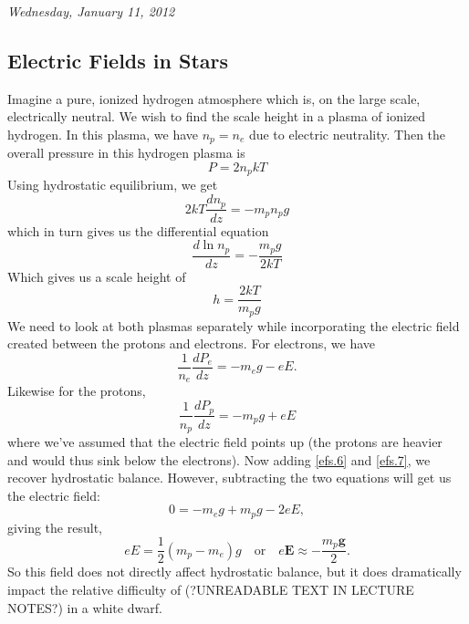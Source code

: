 \documentclass[10pt]{article}
\numberwithin{equation}{section}
\newcommand{\n}{\noindent}
\begin{document}
	\n \textit{Wednesday, January 11, 2012}
	\subsection{Electric Fields in Stars}
	Imagine a pure, ionized hydrogen atmosphere which is, on the large 
scale, electrically neutral. We wish to find the scale height in a plasma 
of ionized hydrogen. In this plasma, we have $n_p=n_e$ due to electric 
neutrality. Then the overall pressure in this hydrogen plasma is
	\begin{equation}
		\label{efs.2} P=2n_pkT
	\end{equation}
	Using hydrostatic equilibrium, we get
	\begin{equation}
		\label{efs.3} 2kT\frac{dn_p}{dz}=-m_pn_pg
	\end{equation}
	which in turn gives us the differential equation
	\begin{equation}
		\label{efs.4} \frac{d\ln n_p}{dz}=-\frac{m_pg}{2kT}
	\end{equation}
	Which gives us a scale height of
	\begin{equation}
		\label{efs.5} h=\frac{2kT}{m_pg}
	\end{equation}
	We need to look at both plasmas separately while incorporating the 
electric field created between the protons and electrons. For electrons, we 
have
	\begin{equation}
		\label{efs.6} \frac{1}{n_e}\frac{dP_e}{dz}=-m_eg-eE.
	\end{equation}
	Likewise for the protons,
	\begin{equation}
		\label{efs.7} \frac{1}{n_p}\frac{dP_p}{dz}=-m_pg+eE
	\end{equation}
	where we've assumed that the electric field points up (the protons are 
heavier and would thus sink below the electrons). Now adding \eqref{efs.6} 
and \eqref{efs.7}, we recover hydrostatic balance. However, subtracting the 
two equations will get us the electric field:
	\begin{equation}
		\label{efs.8} 0=-m_eg+m_pg-2eE,
	\end{equation}
	giving the result,
	\begin{equation}
		\label{efs.9} eE=\frac{1}{2}\left(m_p-m_e\right)g \quad \textrm{or}
\quad e\mathbf{E}\approx -\frac{m_p\mathbf{g}}{2}.
	\end{equation}
	So this field does not directly affect hydrostatic balance, but it does 
dramatically impact the relative difficulty of (?UNREADABLE TEXT IN LECTURE 
NOTES?) in a white dwarf.
\end{document}

